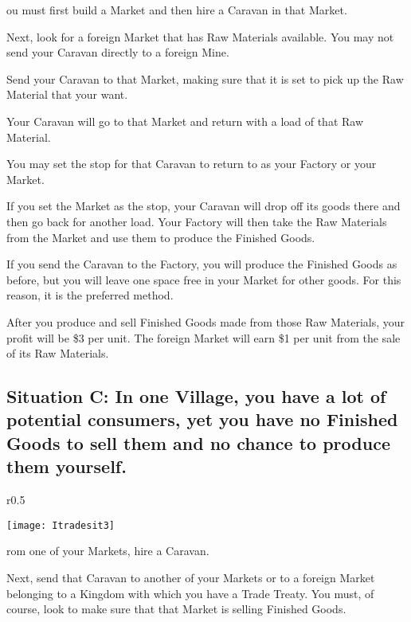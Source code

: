 ou must first build a Market and then hire a Caravan in that Market.

Next, look for a foreign Market that has Raw Materials available. You may not send your Caravan directly to a foreign Mine.

Send your Caravan to that Market, making sure that it is set to pick up the Raw Material that your want.

Your Caravan will go to that Market and return with a load of that Raw Material.

You may set the stop for that Caravan to return to as your Factory or your Market.

If you set the Market as the stop, your Caravan will drop off its goods there and then go back for another load. Your Factory will then take the Raw Materials from the Market and use them to produce the Finished Goods.

If you send the Caravan to the Factory, you will produce the Finished Goods as before, but you will leave one space free in your Market for other goods. For this reason, it is the preferred method.

After you produce and sell Finished Goods made from those Raw Materials, your profit will be \$3 per unit. The foreign Market will earn \$1 per unit from the sale of its Raw Materials.

\clearpage

\subsection{Situation C: In one Village, you have a lot of potential consumers, yet you have no Finished Goods to sell them and no chance to produce them yourself.}

\begin{wrapfigure}{r}{0.5\textwidth}
	\vspace{-20pt}
	\begin{center}
		\texttt{[image: Itradesit3]} %
	\end{center}
	\vspace{-20pt}
\end{wrapfigure}

rom one of your Markets, hire a Caravan.

Next, send that Caravan to another of your Markets or to a foreign Market belonging to a Kingdom with which you have a Trade Treaty. You must, of course, look to make sure that that Market is selling Finished Goods.

